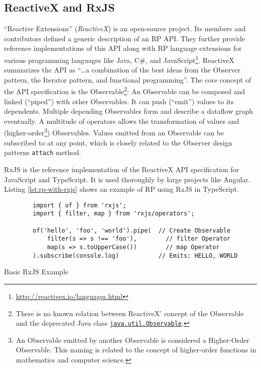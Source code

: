 \documentclass[12pt,a4paper]{article}
\begin{document}
\subsection{ReactiveX and RxJS}

``Reactive Extensions'' (\emph{ReactiveX}) is an open-source project. Its members and contributors defined a generic description of an RP API. They further provide reference implementations of this API along with RP language extensions for various programming languages like Java, C\#, and JavaScript\footnote{\url{http://reactivex.io/languages.html}}. ReactiveX summarizes the API as ``\dots a combination of the best ideas from the Observer pattern, the Iterator pattern, and functional programming''\cite{reactivex}. The core concept of the API specification is the Observable\footnote{There is no known relation between ReactiveX' concept of the Observable and the deprecated Java class \href{https://docs.oracle.com/en/java/javase/11/docs/api/java.base/java/util/Observable.html}{\texttt{java.util.Observable}}.}: An Observable can be composed and linked (``piped'') with other Observables. It can push (``emit'') values to its dependents. Multiple depending Observables form and describe a dataflow graph eventually. A multitude of operators allows the transformation of values and (higher-order\footnote{An Observable emitted by another Observable is considered a Higher-Order Observable. This naming is related to the concept of higher-order functions in mathematics and computer science.}) Observables. Values emitted from an Observable can be subscribed to at any point, which is closely related to the Observer design patterns \texttt{attach} method.

RxJS is the reference implementation of the ReactiveX API specification for JavaScript and TypeScript. It is used thoroughly by large projects like Angular\cite{angualrrxjs}. Listing \ref{lst:rp-with-rxjs} shows an example of RP using RxJS in TypeScript.

\begin{listing}[H]
	\begin{verbatim}
		import { of } from 'rxjs';
		import { filter, map } from 'rxjs/operators';

		of('hello', 'foo', 'world').pipe(  // Create Observable
			filter(s => s !== 'foo'),        // filter Operator
			map(s => s.toUpperCase())        // map Operator
		).subscribe(console.log)           // Emits: HELLO, WORLD
	\end{verbatim}
	\caption{Basic RxJS Example}
	\label{lst:rp-with-rxjs}
\end{listing}
\end{document}
